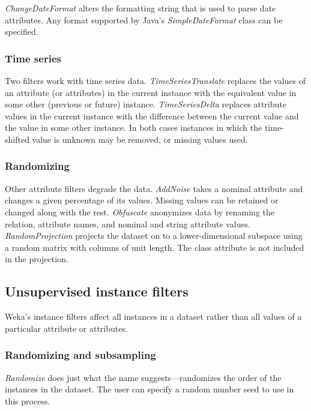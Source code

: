\textit{ChangeDateFormat} alters the formatting string that is used to
parse date attributes. Any format supported by Java's
\textit{SimpleDateFormat} class can be specified.

\subsubsection{Time series}

Two filters work with time series data. \textit{TimeSeriesTranslate}
replaces the values of an attribute (or attributes) in the current
instance with the equivalent value in some other (previous or future)
instance. \textit{TimeSeriesDelta} replaces attribute values in the
current instance with the difference between the current value and the
value in some other instance. In both cases instances in which the
time-shifted value is unknown may be removed, or missing values used.

\subsubsection{Randomizing}

Other attribute filters degrade the data. \textit{AddNoise} takes a
nominal attribute and changes a given percentage of its
values. Missing values can be retained or changed along with the
rest. \textit{Obfuscate} anonymizes data by renaming the relation,
attribute names, and nominal and string attribute
values. \textit{RandomProjection} projects the dataset on to a
lower-dimensional subspace using a random matrix with columns of unit
length. The class attribute is not included in the projection.

\subsection{Unsupervised instance filters}

Weka's instance filters affect all instances in a dataset rather than
all values of a particular attribute or attributes.

\subsubsection{Randomizing and subsampling}

\textit{Randomize} does just what the name suggests---randomizes the
order of the instances in the dataset. The user can specify a random
number seed to use in this process.


